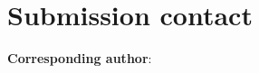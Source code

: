 \documentclass[a4paper,fleqn]{cas-sc}
\begin{document}
\shorttitle{\PaperShortTitle}
\shortauthors{\PaperShortAuthors}
\title{\PaperTitle}
\RenderCasAuthors
\maketitle

\section*{Submission contact}
\noindent\textbf{Corresponding author}: \PaperCorrespondingAuthor\\
\PaperDisplayEmail{\PaperCorrespondingEmail}
\end{document}
